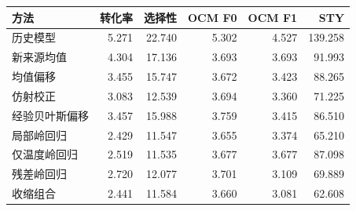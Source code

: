 \begin{tabular}{lrrrrr}
\toprule
方法 & 转化率 & 选择性 & OCM F0 & OCM F1 & STY \\
\midrule
历史模型 & 5.271 & 22.740 & 5.302 & 4.527 & 139.258 \\
新来源均值 & 4.304 & 17.136 & 3.693 & 3.693 & 91.993 \\
均值偏移 & 3.455 & 15.747 & 3.672 & 3.423 & 88.265 \\
仿射校正 & 3.083 & 12.539 & 3.694 & 3.360 & 71.225 \\
经验贝叶斯偏移 & 3.457 & 15.988 & 3.759 & 3.415 & 86.510 \\
局部岭回归 & 2.429 & 11.547 & 3.655 & 3.374 & 65.210 \\
仅温度岭回归 & 2.519 & 11.535 & 3.677 & 3.677 & 87.098 \\
残差岭回归 & 2.720 & 12.077 & 3.701 & 3.109 & 69.889 \\
收缩组合 & 2.441 & 11.584 & 3.660 & 3.081 & 62.608 \\
\bottomrule
\end{tabular}
